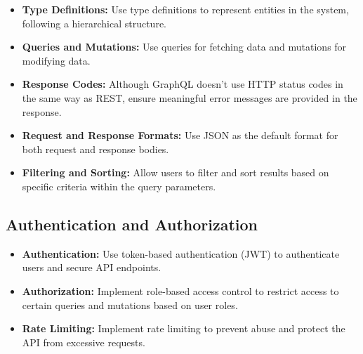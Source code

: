 \begin{itemize}
\item \textbf{Type Definitions:} Use type definitions to represent entities in the system, following a hierarchical structure.
\item \textbf{Queries and Mutations:} Use queries for fetching data and mutations for modifying data.
\item \textbf{Response Codes:} Although GraphQL doesn't use HTTP status codes in the same way as REST, ensure meaningful error messages are provided in the response.
\item \textbf{Request and Response Formats:} Use JSON as the default format for both request and response bodies.
\item \textbf{Filtering and Sorting:} Allow users to filter and sort results based on specific criteria within the query parameters.
\end{itemize}

\subsection{Authentication and Authorization}

\begin{itemize}
\item \textbf{Authentication:} Use token-based authentication (JWT) to authenticate users and secure API endpoints.
\item \textbf{Authorization:} Implement role-based access control to restrict access to certain queries and mutations based on user roles.
\item \textbf{Rate Limiting:} Implement rate limiting to prevent abuse and protect the API from excessive requests.
\end{itemize}
